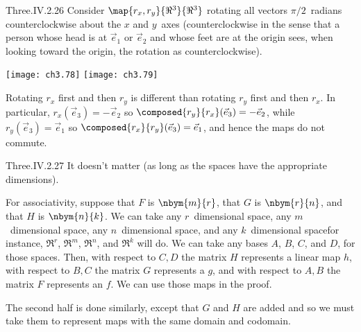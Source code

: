 \begin{ans}{Three.IV.2.26}
      Consider \( \map{r_x,r_y}{\Re^3}{\Re^3} \) rotating all vectors
      \( \pi/2 \)~radians
      counterclockwise about the \( x \) and \( y \)~axes
      (counterclockwise in the sense that a person whose head is at
      \( \vec{e}_1 \) or \( \vec{e}_2 \) and whose feet are at the origin
      sees, when looking toward the origin, the rotation as
      counterclockwise).
      \begin{center}  \small
        \texttt{[image: ch3.78]}
        \qquad
        \texttt{[image: ch3.79]}
      \end{center}
      Rotating $r_x$ first and then $r_y$ is different than
      rotating $r_y$ first and then $r_x$.
      In particular, $r_x(\vec{e}_3)=-\vec{e}_2$
      so $\composed{r_y}{r_x}(\vec{e}_3)=-\vec{e}_2$,
      while $r_y(\vec{e}_3)=\vec{e}_1$ so
      $\composed{r_x}{r_y}(\vec{e}_3)=\vec{e}_1$,
      and hence the maps do not commute.
    
\end{ans}
\begin{ans}{Three.IV.2.27}
      It doesn't matter (as long as the spaces have the appropriate
     dimensions).

      For associativity,
      suppose that $F$ is $\nbym{m}{r}$, that $G$ is $\nbym{r}{n}$, and
      that $H$ is $\nbym{n}{k}$.
      We can take any $r$~dimensional space,
      any $m$~dimensional space, any $n$~dimensional space, and any
      $k$~dimensional space\Dash for instance,
      $\Re^r$, $\Re^m$, $\Re^n$, and $\Re^k$ will do.
      We can take any bases $A$, $B$, $C$, and $D$, for those spaces.
      Then,
      with respect to $C,D$ the matrix $H$ represents a linear map $h$,
      with respect to $B,C$ the matrix $G$ represents a $g$,
      and with respect to $A,B$ the matrix $F$ represents an $f$.
      We can use those maps in the proof.

      The second half is done similarly, except that $G$ and $H$ are added
      and so we must take them to represent maps with the same domain
      and codomain.
    
\end{ans}
